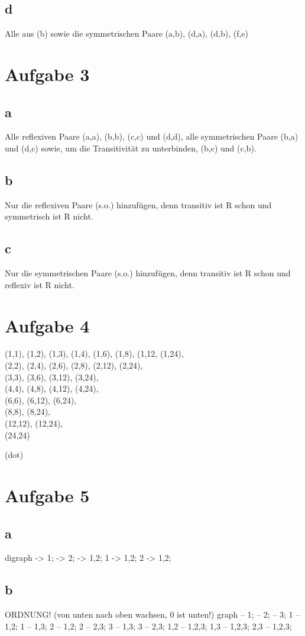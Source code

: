 \documentclass[11pt, oneside]{scrartcl}   	%
\begin{document}
\subsection*{d}
Alle aus (b) sowie die symmetrischen Paare (a,b), (d,a), (d,b), (f,e)

\section*{Aufgabe 3}

\subsection*{a}
Alle reflexiven Paare (a,a), (b,b), (c,c) und (d,d), alle symmetrischen Paare (b,a) und (d,c) sowie, um die Transitivität zu unterbinden, (b,c) und (c,b).

\subsection*{b}
Nur die reflexiven Paare (s.o.) hinzufügen, denn transitiv ist R schon und symmetrisch ist R nicht.

\subsection*{c}
Nur die symmetrischen Paare (s.o.) hinzufügen, denn transitiv ist R schon und reflexiv ist R nicht.

\section*{Aufgabe 4}
(1,1), (1,2), (1,3), (1,4), (1,6), (1,8), (1,12, (1,24),\\
(2,2), (2,4), (2,6), (2,8), (2,12), (2,24),\\
(3,3), (3,6), (3,12), (3,24),\\
(4,4), (4,8), (4,12), (4,24),\\
(6,6), (6,12), (6,24),\\
(8,8), (8,24),\\
(12,12), (12,24),\\
(24,24)

(dot)

\section*{Aufgabe 5}

\subsection*{a}
digraph {
{} -> {1};
{} -> {2};
{} -> {1,2};
{1} -> {1,2};
{2} -> {1,2};
}

\subsection*{b}
ORDNUNG! (von unten nach oben wachsen, 0 ist unten!)
graph {
{} -- {1};
{} -- {2};
{} -- {3};
{1} -- {1,2};
{1} -- {1,3};
{2} -- {1,2};
{2} -- {2,3};
{3} -- {1,3};
{3} -- {2,3};
{1,2} -- {1,2,3};
{1,3} -- {1,2,3};
{2,3} -- {1,2,3};
}
\end{document}
